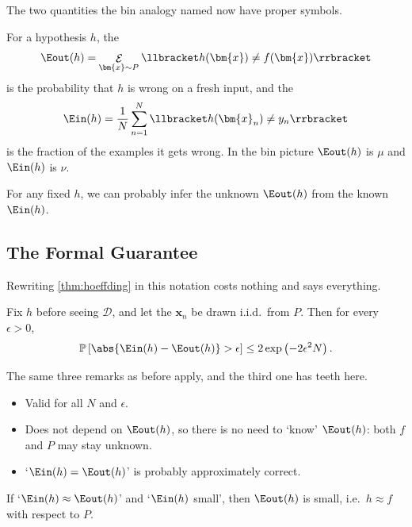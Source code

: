 The two quantities the bin analogy named now have proper symbols.

\begin{definition}\label{def:errors}
    For a hypothesis \(h\), the 
    \[
        \Eout(h) = \mathop{\mathcal{E}}_{\bm{x} \sim P}
        \llbracket h(\bm{x}) \neq f(\bm{x}) \rrbracket
    \]
    is the probability that \(h\) is wrong on a fresh input, and the
    \[
        \Ein(h) = \frac{1}{N} \sum_{n=1}^{N}
        \llbracket h(\bm{x}_n) \neq y_n \rrbracket
    \]
    is the fraction of the examples it gets wrong. In the bin picture
    \(\Eout(h)\) is \(\mu\) and \(\Ein(h)\) is \(\nu\).
\end{definition}

\begin{moral}
    For any fixed \(h\), we can probably infer the unknown \(\Eout(h)\) from the
    known \(\Ein(h)\).
\end{moral}

\subsection{The Formal Guarantee}

Rewriting \autoref{thm:hoeffding} in this notation costs nothing and says
everything.

\begin{theorem}\label{thm:hoeffding-h}
    Fix \(h\) before seeing \(\mathcal{D}\), and let the \(\bm{x}_n\) be drawn
    i.i.d.\ from \(P\). Then for every \(\epsilon > 0\),
    \[
        \mathbb{P}\left[ \abs{\Ein(h) - \Eout(h)} > \epsilon \right]
        \le 2 \exp \left( -2 \epsilon^2 N \right) .
    \]
\end{theorem}

The same three remarks as before apply, and the third one has teeth here.

\begin{itemize}
    \item Valid for all \(N\) and \(\epsilon\).
    \item Does not depend on \(\Eout(h)\), so there is no need to `know'
        \(\Eout(h)\): both \(f\) and \(P\) may stay unknown.
    \item `\(\Ein(h) = \Eout(h)\)' is probably approximately correct.
\end{itemize}

\begin{moral}
    If `\(\Ein(h) \approx \Eout(h)\)' and `\(\Ein(h)\) small', then
    \(\Eout(h)\) is small, i.e.\ \(h \approx f\) with respect to \(P\).
\end{moral}

